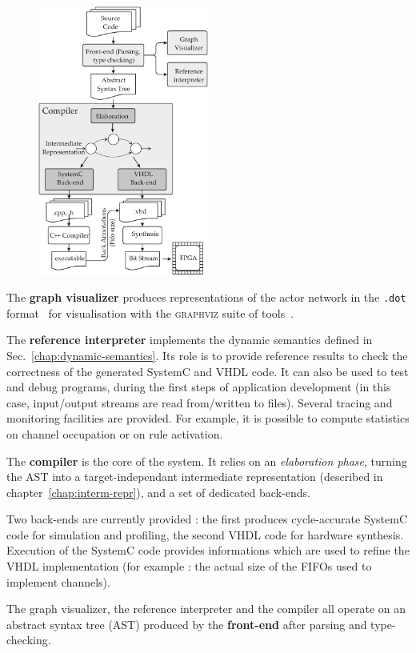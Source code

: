 \begin{figure}[t]
  \centering
  \includegraphics[width=0.5\textwidth]{figs/toolset}
  \caption{}
  \label{fig:toolset}
\end{figure}

The \textbf{graph visualizer} produces representations of the actor network in the \texttt{.dot}
format~\cite{North1994}
for visualisation with the \textsc{graphviz} suite of tools~\cite{graphivz}.

The \textbf{reference interpreter} implements the dynamic semantics defined in
Sec.~\ref{chap:dynamic-semantics}. 
 Its role is to provide
reference results to check the correctness of the generated SystemC and VHDL code. It can also be
used to test and debug programs, during the first steps of application development (in this case,
input/output streams are read from/written to files). Several 
tracing and monitoring facilities are provided. For example, it is possible to compute statistics on
channel occupation or on rule activation.

The \textbf{compiler} is the core of the system. It relies on an \emph{elaboration phase}, turning
the AST into a target-independant intermediate representation (described in
chapter~\ref{chap:interm-repr}), and a set of dedicated back-ends.

Two back-ends are currently provided : the first produces cycle-accurate SystemC code for simulation
and profiling, the second VHDL code for hardware synthesis. Execution of the SystemC code provides
informations which are used to refine the VHDL implementation (for example : the actual size of the
FIFOs used to implement channels).

\medskip
The graph visualizer, the reference interpreter and the compiler all operate on an abstract syntax
tree (AST) produced by the \textbf{front-end} after parsing and type-checking.

